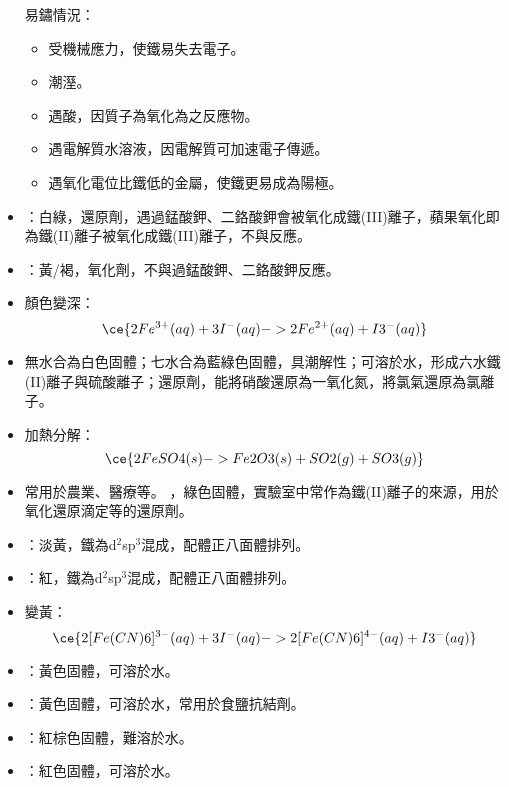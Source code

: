 \documentclass[a4paper,12pt]{report}
\begin{document}
\begin{itemize}
易鏽情況：
\begin{itemize}
\item 受機械應力，使鐵易失去電子。
\item 潮溼。
\item 遇酸，因質子為氧化為之反應物。
\item 遇電解質水溶液，因電解質可加速電子傳遞。
\item 遇氧化電位比鐵低的金屬，使鐵更易成為陽極。
\end{itemize}
\bit
\item {}：白綠，還原劑，遇過錳酸鉀、二鉻酸鉀會被氧化成鐵(III)離子，蘋果氧化即為鐵(II)離子被氧化成鐵(III)離子，不與反應。
\item {}：黃/褐，氧化劑，不與過錳酸鉀、二鉻酸鉀反應。
\item {}顏色變深：
\[\ce{2Fe^{3+}(aq) + 3I^-(aq) -> 2Fe^{2+}(aq) + I3^-(aq)}\]
\eit
{}
\bit
\item 無水合為白色固體；七水合為藍綠色固體，具潮解性；可溶於水，形成六水鐵(II)離子與硫酸離子；還原劑，能將硝酸還原為一氧化氮，將氯氣還原為氯離子。
\item 加熱分解：
\[\ce{2FeSO4(s) -> Fe2O3(s) + SO2(g) + SO3(g)}\]
\item 常用於農業、醫療等。
\eit
{}
，綠色固體，實驗室中常作為鐵(II)離子的來源，用於氧化還原滴定等的還原劑。
\bit
\item {}：淡黃，鐵為d$^2$sp$^3$混成，配體正八面體排列。
\item {}：紅，鐵為d$^2$sp$^3$混成，配體正八面體排列。
\item {}變黃：
\[\ce{2[Fe(CN)6]^{3-}(aq) + 3I^-(aq) -> 2[Fe(CN)6]^{4-}(aq) + I3^-(aq)}\]
\item {}：黃色固體，可溶於水。
\item {}：黃色固體，可溶於水，常用於食鹽抗結劑。
\item {}：紅棕色固體，難溶於水。
\item {}：紅色固體，可溶於水。

\end{itemize}
\end{document}

